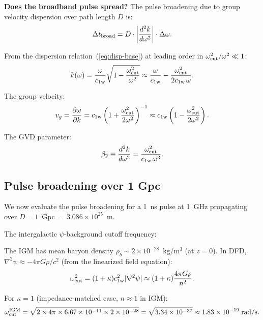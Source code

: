 \documentclass[11pt]{article}
\newcommand{\ee}[1]{\times 10^{#1}}
\newcommand{\cfield}{c_{1\mathrm{w}}}
\begin{document}
\textbf{Does the broadband pulse spread?} The pulse broadening due to
group velocity dispersion over path length $D$ is:
\begin{equation}
\Delta t_{\rm broad} = D \cdot \left|\frac{d^2 k}{d\omega^2}\right| \cdot \Delta\omega.
\end{equation}

From the dispersion relation~(\ref{eq:disp-base}) at leading order
in $\omega_{\rm cut}^2/\omega^2 \ll 1$:
\begin{equation}
k(\omega) = \frac{\omega}{\cfield}\sqrt{1 - \frac{\omega_{\rm cut}^2}{\omega^2}}
\approx \frac{\omega}{\cfield} - \frac{\omega_{\rm cut}^2}{2\cfield\,\omega}.
\end{equation}

The group velocity:
\begin{equation}
v_g = \frac{\partial\omega}{\partial k} = \cfield\left(1 + \frac{\omega_{\rm cut}^2}{2\omega^2}\right)^{-1}
\approx \cfield\left(1 - \frac{\omega_{\rm cut}^2}{2\omega^2}\right).
\label{eq:vg-leading}
\end{equation}

The GVD parameter:
\begin{equation}
\beta_2 \equiv \frac{d^2 k}{d\omega^2} = \frac{\omega_{\rm cut}^2}{\cfield\,\omega^3}.
\label{eq:gvd}
\end{equation}

\subsection{Pulse broadening over 1 Gpc}

We now evaluate the pulse broadening for a 1~ns pulse at 1~GHz
propagating over $D = 1$~Gpc $= 3.086\ee{25}$~m.

The intergalactic $\psi$-background cutoff frequency:

The IGM has mean baryon density $\rho_b \sim 2\ee{-28}$~kg/m$^3$
(at $z=0$). In DFD, $\nabla^2\psi \approx -4\pi G\rho/c^2$
(from the linearized field equation):
\begin{equation}
\omega_{\rm cut}^2 = (1+\kappa)\cfield^2|\nabla^2\psi| \approx (1+\kappa)\frac{4\pi G\rho}{n^2}.
\end{equation}

For $\kappa = 1$ (impedance-matched case, $n \approx 1$ in IGM):
\begin{equation}
\omega_{\rm cut}^{\rm IGM} = \sqrt{2 \times 4\pi \times 6.67\ee{-11} \times 2\ee{-28}}
= \sqrt{3.34\ee{-37}} \approx 1.83\ee{-19}\;\text{rad/s}.
\end{equation}
\end{document}
